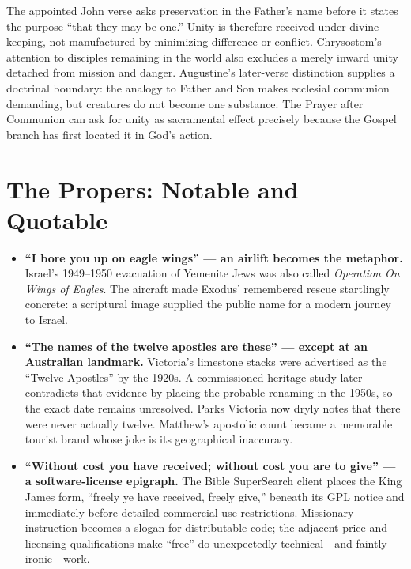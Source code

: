 \begin{deepstudy}
The appointed John verse asks preservation in the Father's name before it states the purpose “that they may be one.” Unity is therefore received under divine keeping, not manufactured by minimizing difference or conflict. Chrysostom's attention to disciples remaining in the world also excludes a merely inward unity detached from mission and danger. Augustine's later-verse distinction supplies a doctrinal boundary: the analogy to Father and Son makes ecclesial communion demanding, but creatures do not become one substance. The Prayer after Communion can ask for unity as sacramental effect precisely because the Gospel branch has first located it in God's action.

\section*{The Propers: Notable and Quotable}

{\small
\begin{itemize}
\item \textbf{“I bore you up on eagle wings” --- an airlift becomes the metaphor.\enspace{}} Israel's 1949--1950 evacuation of Yemenite Jews was also called \emph{Operation On Wings of Eagles}. The aircraft made Exodus' remembered rescue startlingly concrete: a scriptural image supplied the public name for a modern journey to Israel.

\item \textbf{“The names of the twelve apostles are these” --- except at an Australian landmark.\enspace{}} Victoria's limestone stacks were advertised as the “Twelve Apostles” by the 1920s. A commissioned heritage study later contradicts that evidence by placing the probable renaming in the 1950s, so the exact date remains unresolved. Parks Victoria now dryly notes that there were never actually twelve. Matthew's apostolic count became a memorable tourist brand whose joke is its geographical inaccuracy.

\item \textbf{“Without cost you have received; without cost you are to give” --- a software-license epigraph.\enspace{}} The Bible SuperSearch client places the King James form, “freely ye have received, freely give,” beneath its GPL notice and immediately before detailed commercial-use restrictions. Missionary instruction becomes a slogan for distributable code; the adjacent price and licensing qualifications make “free” do unexpectedly technical---and faintly ironic---work.
\end{itemize}
}


\end{deepstudy}
